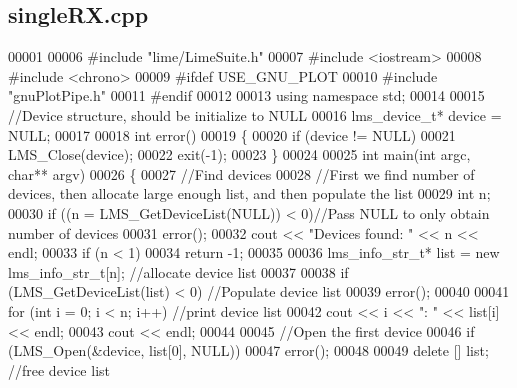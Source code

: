 \subsection{single\+R\+X.\+cpp}
\label{singleRX_8cpp_source}

\begin{DoxyCode}
00001 
00006 \textcolor{preprocessor}{#include "lime/LimeSuite.h"}
00007 \textcolor{preprocessor}{#include <iostream>}
00008 \textcolor{preprocessor}{#include <chrono>}
00009 \textcolor{preprocessor}{#ifdef USE\_GNU\_PLOT}
00010 \textcolor{preprocessor}{#include "gnuPlotPipe.h"}
00011 \textcolor{preprocessor}{#endif}
00012 
00013 \textcolor{keyword}{using namespace }std;
00014 
00015 \textcolor{comment}{//Device structure, should be initialize to NULL}
00016 lms_device_t* device = NULL;
00017 
00018 \textcolor{keywordtype}{int} error()
00019 \{
00020     \textcolor{keywordflow}{if} (device != NULL)
00021         LMS_Close(device);
00022     exit(-1);
00023 \}
00024 
00025 \textcolor{keywordtype}{int} main(\textcolor{keywordtype}{int} argc, \textcolor{keywordtype}{char}** argv)
00026 \{
00027     \textcolor{comment}{//Find devices}
00028     \textcolor{comment}{//First we find number of devices, then allocate large enough list,  and then populate the list}
00029     \textcolor{keywordtype}{int} n;
00030     \textcolor{keywordflow}{if} ((n = LMS_GetDeviceList(NULL)) < 0)\textcolor{comment}{//Pass NULL to only obtain number of devices}
00031         error();
00032     cout << \textcolor{stringliteral}{"Devices found: "} << n << endl;
00033     \textcolor{keywordflow}{if} (n < 1)
00034         \textcolor{keywordflow}{return} -1;
00035 
00036     lms_info_str_t* list = \textcolor{keyword}{new} lms_info_str_t[n];   \textcolor{comment}{//allocate device list}
00037 
00038     \textcolor{keywordflow}{if} (LMS_GetDeviceList(list) < 0)                \textcolor{comment}{//Populate device list}
00039         error();
00040 
00041     \textcolor{keywordflow}{for} (\textcolor{keywordtype}{int} i = 0; i < n; i++)                     \textcolor{comment}{//print device list}
00042         cout << i << \textcolor{stringliteral}{": "} << list[i] << endl;
00043     cout << endl;
00044 
00045     \textcolor{comment}{//Open the first device}
00046     \textcolor{keywordflow}{if} (LMS_Open(&device, list[0], NULL))
00047         error();
00048 
00049     \textcolor{keyword}{delete} [] list;                                 \textcolor{comment}{//free device list}

\end{DoxyCode}
